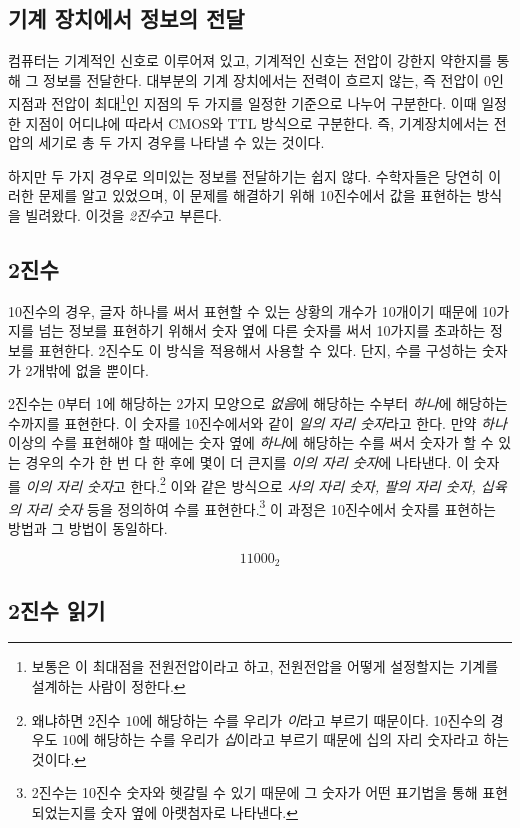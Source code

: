 \documentclass{article}
\begin{document}
\subsection{기계 장치에서 정보의 전달}

컴퓨터는 기계적인 신호로 이루어져 있고, 기계적인 신호는 전압이 강한지 약한지를 통해
그 정보를 전달한다. 대부분의 기계 장치에서는 전력이 흐르지 않는, 즉 전압이 0인 지점과
전압이 최대\footnote{보통은 이 최대점을 전원전압이라고 하고, 전원전압을 어떻게
설정할지는 기계를 설계하는 사람이 정한다.}인
지점의 두 가지를 일정한 기준으로 나누어 구분한다.
이때 일정한 지점이 어디냐에 따라서 CMOS와 TTL 방식으로 구분한다.
즉, 기계장치에서는 전압의 세기로 총 두 가지 경우를 나타낼 수 있는 것이다.

하지만 두 가지 경우로 의미있는 정보를 전달하기는 쉽지 않다. 수학자들은 당연히 이러한
문제를 알고 있었으며, 이 문제를 해결하기 위해 10진수에서 값을 표현하는 방식을 빌려왔다.
이것을 \textit{2진수}고 부른다.

\subsection{2진수}

10진수의 경우, 글자 하나를 써서 표현할 수 있는 상황의 개수가
10개이기 때문에 10가지를 넘는 정보를 표현하기 위해서 숫자 옆에 다른 숫자를 써서
10가지를 초과하는 정보를 표현한다. 2진수도 이 방식을 적용해서 사용할 수 있다.
단지, 수를 구성하는 숫자가 2개밖에 없을 뿐이다.

2진수는 0부터 1에 해당하는 2가지 모양으로 \textit{없음}에 해당하는 수부터 \textit{하나}에
해당하는 수까지를 표현한다. 이 숫자를 10진수에서와 같이 \textit{일의 자리 숫자}라고 한다.
만약 \textit{하나} 이상의 수를 표현해야 할 때에는 숫자 옆에 \textit{하나}에 해당하는 수를 써서
숫자가 할 수 있는 경우의 수가 한 번 다 한 후에 몇이 더 큰지를 \textit{이의 자리 숫자}에
나타낸다. 이 숫자를 \textit{이의 자리 숫자}고 한다.\footnote{왜냐하면 2진수 $10$에
해당하는 수를 우리가 \textit{이}라고 부르기 때문이다. 10진수의 경우도 $10$에 해당하는
수를 우리가 \textit{십}이라고 부르기 때문에 십의 자리 숫자라고 하는 것이다.}
이와 같은 방식으로 \textit{사의 자리 숫자, 팔의 자리 숫자, 십육의 자리 숫자} 등을
정의하여 수를 표현한다.\footnote{2진수는 10진수 숫자와 헷갈릴 수 있기 때문에 
그 숫자가 어떤 표기법을 통해 표현되었는지를 숫자 옆에 아랫첨자로 나타낸다.}
이 과정은 10진수에서 숫자를 표현하는 방법과 그 방법이 동일하다.

$$
11000_2
$$

\subsection{2진수 읽기}
\end{document}
